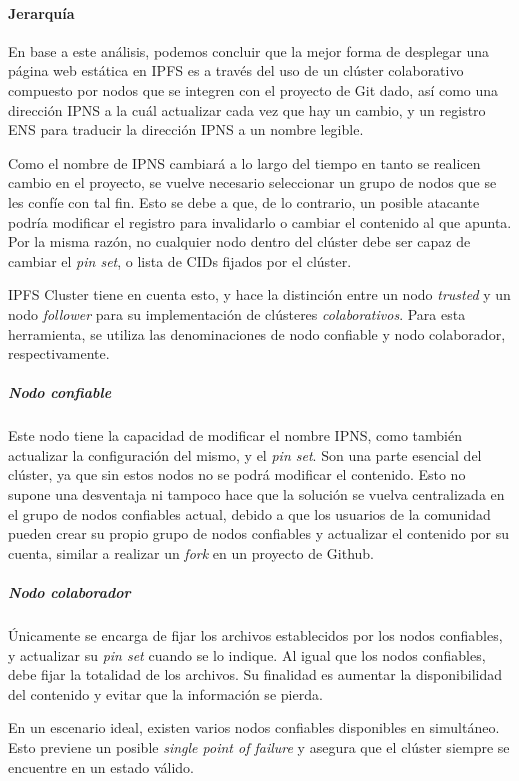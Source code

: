 \paragraph{Jerarquía}

En base a este análisis, podemos concluir que la mejor forma de desplegar una página web estática en IPFS es a través del uso de un clúster colaborativo compuesto por nodos que se integren con el proyecto de Git dado, así como una dirección IPNS a la cuál actualizar cada vez que hay un cambio, y un registro ENS para traducir la dirección IPNS a un nombre legible.

Como el nombre de IPNS cambiará a lo largo del tiempo en tanto se realicen cambio en el proyecto, se vuelve necesario seleccionar un grupo de nodos que se les confíe con tal fin. Esto se debe a que, de lo contrario, un posible atacante podría modificar el registro para invalidarlo o cambiar el contenido al que apunta. Por la misma razón, no cualquier nodo dentro del clúster debe ser capaz de cambiar el \textit{pin set}, o lista de CIDs fijados por el clúster.

IPFS Cluster tiene en cuenta esto, y hace la distinción entre un nodo \textit{trusted} y un nodo \textit{follower} para su implementación de clústeres \textit{colaborativos}\cite{ipfs-cluster-collaborative}. Para esta herramienta, se utiliza las denominaciones de nodo confiable y nodo colaborador, respectivamente.

\subparagraph{Nodo confiable} Este nodo tiene la capacidad de modificar el nombre IPNS, como también actualizar la configuración del mismo, y el \textit{pin set}. Son una parte esencial del clúster, ya que sin estos nodos no se podrá modificar el contenido. Esto no supone una desventaja ni tampoco hace que la solución se vuelva centralizada en el grupo de nodos confiables actual, debido a que los usuarios de la comunidad pueden crear su propio grupo de nodos confiables y actualizar el contenido por su cuenta, similar a realizar un \textit{fork} en un proyecto de Github.

\subparagraph{Nodo colaborador} Únicamente se encarga de fijar los archivos establecidos por los nodos confiables, y actualizar su \textit{pin set} cuando se lo indique. Al igual que los nodos confiables, debe fijar la totalidad de los archivos. Su finalidad es aumentar la disponibilidad del contenido y evitar que la información se pierda.

En un escenario ideal, existen varios nodos confiables disponibles en simultáneo. Esto previene un posible \textit{single point of failure} y asegura que el clúster siempre se encuentre en un estado válido.

